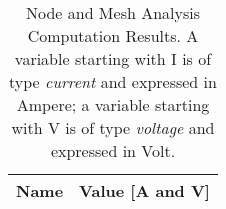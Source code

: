 \begin{table}[h]
  \centering
  \begin{tabular}{|l|r|}
    \hline    
    {\bf Name} & {\bf Value [A and V]} \\ \hline
    
  \end{tabular}
  \caption{Node and Mesh Analysis Computation Results. A variable starting with I is of type {\em current}
    and expressed in Ampere; a variable starting with V is of type {\it voltage} and expressed in
    Volt.}
  \label{tab:op}
\end{table}